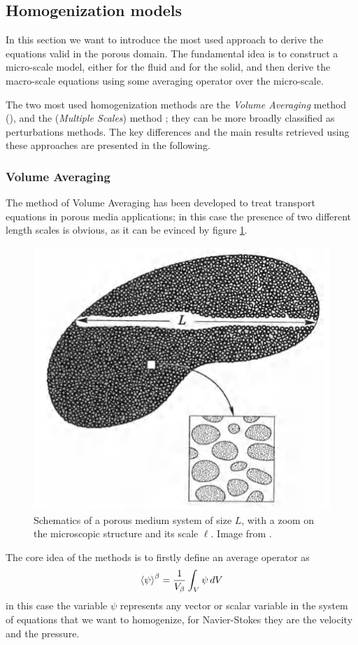 \subsection{Homogenization models}

In this section we want to introduce the most used approach to derive the equations valid in the porous domain.
The fundamental idea is to construct a micro-scale model, either for the fluid and for the solid, and then derive the macro-scale equations using some averaging operator over the micro-scale.

The two most used homogenization methods are the \textit{Volume Averaging} method (\citet{whitaker2013method}), and the (\textit{Multiple Scales}) method \citet{mei2010homogenization}; they can be more broadly classified as perturbations methods. 
The key differences and the main results retrieved using these approaches are presented in the following.


\subsubsection{Volume Averaging}
\label{sec:vans}

The method of Volume Averaging has been developed to treat transport equations in porous media applications; in this case the presence of two different length scales is obvious, as it can be evinced by figure \ref{fig:porsystem}.
	
	\begin{figure}[h]
		\centering
		\includegraphics[width=0.5\linewidth]{chapter_1/por_system}
		\caption{Schematics of a porous medium system of size $L$, with a zoom on the microscopic structure and its scale $\ell$. Image from \citet{whitaker2013method}.}
		\label{fig:porsystem}
	\end{figure}

The core idea of the methods is to firstly define an average operator as $${\left< \psi \right>}^{\beta} = \dfrac{1}{V_\beta} \displaystyle\int_{V} \psi \, dV$$ in this case the variable $\psi$ represents any vector or scalar variable in the system of equations that we want to homogenize, for Navier-Stokes they are the velocity and the pressure.

